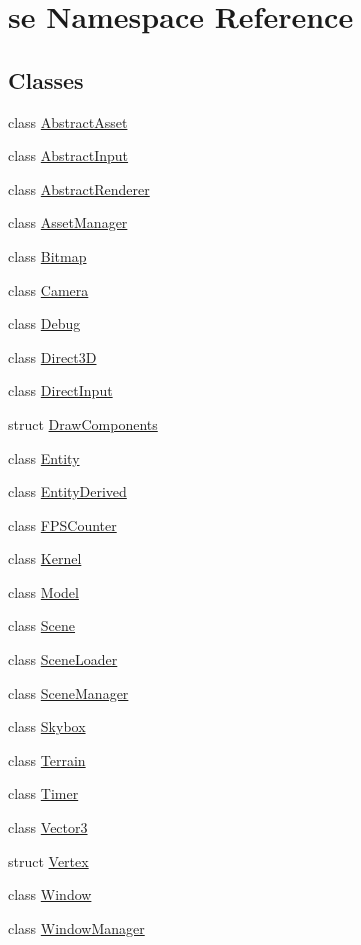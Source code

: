 \hypertarget{namespacese}{}\section{se Namespace Reference}
\label{namespacese}
\subsection*{Classes}
\begin{DoxyCompactItemize}
\item 
class \mbox{\hyperlink{classse_1_1_abstract_asset}{Abstract\+Asset}}
\item 
class \mbox{\hyperlink{classse_1_1_abstract_input}{Abstract\+Input}}
\item 
class \mbox{\hyperlink{classse_1_1_abstract_renderer}{Abstract\+Renderer}}
\item 
class \mbox{\hyperlink{classse_1_1_asset_manager}{Asset\+Manager}}
\item 
class \mbox{\hyperlink{classse_1_1_bitmap}{Bitmap}}
\item 
class \mbox{\hyperlink{classse_1_1_camera}{Camera}}
\item 
class \mbox{\hyperlink{classse_1_1_debug}{Debug}}
\item 
class \mbox{\hyperlink{classse_1_1_direct3_d}{Direct3D}}
\item 
class \mbox{\hyperlink{classse_1_1_direct_input}{Direct\+Input}}
\item 
struct \mbox{\hyperlink{structse_1_1_draw_components}{Draw\+Components}}
\item 
class \mbox{\hyperlink{classse_1_1_entity}{Entity}}
\item 
class \mbox{\hyperlink{classse_1_1_entity_derived}{Entity\+Derived}}
\item 
class \mbox{\hyperlink{classse_1_1_f_p_s_counter}{F\+P\+S\+Counter}}
\item 
class \mbox{\hyperlink{classse_1_1_kernel}{Kernel}}
\item 
class \mbox{\hyperlink{classse_1_1_model}{Model}}
\item 
class \mbox{\hyperlink{classse_1_1_scene}{Scene}}
\item 
class \mbox{\hyperlink{classse_1_1_scene_loader}{Scene\+Loader}}
\item 
class \mbox{\hyperlink{classse_1_1_scene_manager}{Scene\+Manager}}
\item 
class \mbox{\hyperlink{classse_1_1_skybox}{Skybox}}
\item 
class \mbox{\hyperlink{classse_1_1_terrain}{Terrain}}
\item 
class \mbox{\hyperlink{classse_1_1_timer}{Timer}}
\item 
class \mbox{\hyperlink{classse_1_1_vector3}{Vector3}}
\item 
struct \mbox{\hyperlink{structse_1_1_vertex}{Vertex}}
\item 
class \mbox{\hyperlink{classse_1_1_window}{Window}}
\item 
class \mbox{\hyperlink{classse_1_1_window_manager}{Window\+Manager}}
\end{DoxyCompactItemize}

